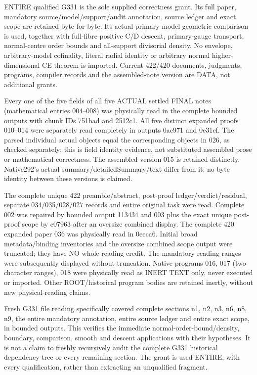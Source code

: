 \documentclass[11pt]{article}
\begin{document}
ENTIRE qualified G331 is the sole supplied correctness grant. Its full paper, mandatory source/model/support/audit annotation, source ledger and exact scope are retained byte-for-byte. Its actual primary-model geometric comparison is used, together with full-fibre positive C/D descent, primary-gauge transport, normal-centre order bounds and all-support divisorial density. No envelope, arbitrary-model cofinality, literal radial identity or arbitrary normal higher-dimensional CE theorem is imported. Current 422/420 documents, judgments, programs, compiler records and the assembled-note version are DATA, not additional grants.

Every one of the five fields of all five ACTUAL settled FINAL notes (mathematical entries 004--008) was physically read in the complete bounded outputs with chunk IDs 751bad and 2512c1. All five distinct expanded proofs 010--014 were separately read completely in outputs 0ac971 and 0e31cf. The parsed individual actual objects equal the corresponding objects in 026, as checked separately; this is field identity evidence, not substituted assembled prose or mathematical correctness. The assembled version 015 is retained distinctly. Native292's actual summary/detailedSummary/text differ from it; no byte identity between these versions is claimed.

The complete unique 422 preamble/abstract, post-proof ledger/verdict/residual, separate 034/035/028/027 records and entire original task were read. Complete 002 was repaired by bounded output 113434 and 003 plus the exact unique post-proof scope by c07963 after an oversize combined display. The complete 420 expanded paper 036 was physically read in 0eeca6. Initial broad metadata/binding inventories and the oversize combined scope output were truncated; they have NO whole-reading credit. The mandatory reading ranges were subsequently displayed without truncation. Native programs 016, 017 (two character ranges), 018 were physically read as INERT TEXT only, never executed or imported. Other ROOT/historical program bodies are retained inertly, without new physical-reading claims.

Fresh G331 file reading specifically covered complete sections n1, n2, n3, n6, n8, n9, the entire mandatory annotation, entire source ledger and entire exact scope, in bounded outputs. This verifies the immediate normal-order-bound/density, boundary, comparison, smooth and descent applications with their hypotheses. It is not a claim to freshly recursively audit the complete G331 historical dependency tree or every remaining section. The grant is used ENTIRE, with every qualification, rather than extracting an unqualified fragment.
\end{document}

